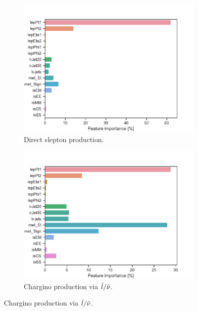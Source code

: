 \begin{figure}[H]
    \centering
    \begin{subfigure}[t!]{0.49\textwidth}
        \includegraphics[width = \textwidth]{Figures/SlepSlep/ML/BDT/Low_level/High/featureImportance.pdf}
        \caption{Direct slepton production.}
        \label{fig:featSlepslepHigh}
    \end{subfigure}
    \begin{subfigure}[t!]{0.49\textwidth}
        \includegraphics[width = \textwidth]{Figures/SlepSnu/BDT/Low_level/High/featureImportance.pdf}
        \caption{Chargino production via $\Tilde{l}/\Tilde{\nu}$.}
        \label{fig:featSlepsnuHigh}
    \end{subfigure}

\end{figure}

